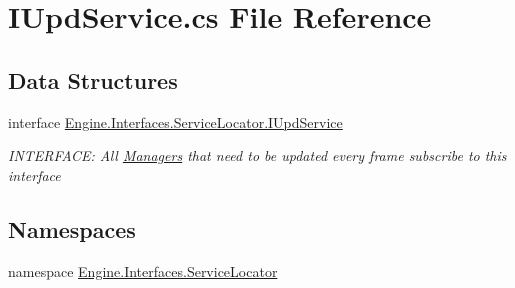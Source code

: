 \hypertarget{a00140}{}\section{I\+Upd\+Service.\+cs File Reference}
\label{a00140}
\subsection*{Data Structures}
\begin{DoxyCompactItemize}
\item 
interface \hyperlink{a00478}{Engine.\+Interfaces.\+Service\+Locator.\+I\+Upd\+Service}
\begin{DoxyCompactList}\small\item\em I\+N\+T\+E\+R\+F\+A\+CE\+: All \hyperlink{a00239}{Managers} that need to be updated every frame subscribe to this interface \end{DoxyCompactList}\end{DoxyCompactItemize}
\subsection*{Namespaces}
\begin{DoxyCompactItemize}
\item 
namespace \hyperlink{a00264}{Engine.\+Interfaces.\+Service\+Locator}
\end{DoxyCompactItemize}
